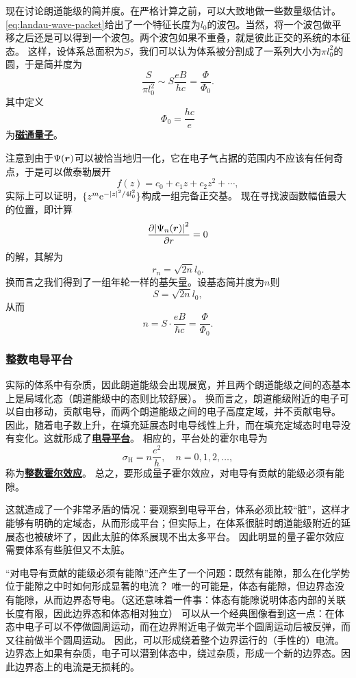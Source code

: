 \documentclass[hyperref, UTF8, a4paper]{ctexart}
\newcommand*{\ee}{\mathrm{e}}
\newcommand*{\concept}[1]{\underline{\textbf{#1}}}
\begin{document}
现在讨论朗道能级的简并度。在严格计算之前，可以大致地做一些数量级估计。
\eqref{eq:landau-wave-packet}给出了一个特征长度为$l_0$的波包。当然，将一个波包做平移之后还是可以得到一个波包。两个波包如果不重叠，就是彼此正交的系统的本征态。
这样，设体系总面积为$S$，我们可以认为体系被分割成了一系列大小为$\pi l_0^2$的圆，于是简并度为
\[
    \frac{S}{\pi l_0^2} \sim S \frac{eB}{h c} = \frac{\Phi}{\Phi_0}.
\]
其中定义
\begin{equation}
    \Phi_0 = \frac{h c}{e}
\end{equation}
为\concept{磁通量子}。

注意到由于$\Psi(\vb*{r})$可以被恰当地归一化，它在电子气占据的范围内不应该有任何奇点，于是可以做泰勒展开
\[
    f(z) = c_0 + c_1 z + c_2 z^2 + \cdots,
\]
实际上可以证明，$\{z^m \ee^{- \abs{z}^2 / 4 l_0^2}\}$构成一组完备正交基。
现在寻找波函数幅值最大的位置，即计算
\[
    \pdv{\abs{\Psi_n(\vb*{r})}^2}{r} = 0
\]
的解，其解为
\[
    r_n = \sqrt{2n} l_0.
\]
换而言之我们得到了一组年轮一样的基矢量。设基态简并度为$n$则
\[
    S = \sqrt{2n} l_0,
\]
从而
\[
    n = S \cdot \frac{eB}{\hbar c} = \frac{\Phi}{\Phi_0}.
\]

\subsubsection{整数电导平台}

实际的体系中有杂质，因此朗道能级会出现展宽，并且两个朗道能级之间的态基本上是局域化态（朗道能级中的态则比较舒展）。
换而言之，朗道能级附近的电子可以自由移动，贡献电导，而两个朗道能级之间的电子高度定域，并不贡献电导。
因此，随着电子数上升，在填充延展态时电导线性上升，而在填充定域态时电导没有变化。这就形成了\concept{电导平台}。
相应的，平台处的霍尔电导为
\[
    \sigma_\text{H} = n \frac{e^2}{h}, \quad n = 0, 1, 2, \ldots,
\]
称为\concept{整数霍尔效应}。
总之，要形成量子霍尔效应，对电导有贡献的能级必须有能隙。

这就造成了一个非常矛盾的情况：要观察到电导平台，体系必须比较“脏”，这样才能够有明确的定域态，从而形成平台；但实际上，在体系很脏时朗道能级附近的延展态也被破坏了，因此太脏的体系展现不出太多平台。
因此明显的量子霍尔效应需要体系有些脏但又不太脏。

“对电导有贡献的能级必须有能隙”还产生了一个问题：既然有能隙，那么在化学势位于能隙之中时如何形成显著的电流？
唯一的可能是，体态有能隙，但边界态没有能隙，从而边界态导电。（这还意味着一件事：体态有能隙说明体态内部的关联长度有限，因此边界态和体态相对独立）
可以从一个经典图像看到这一点：在体态中电子可以不停做圆周运动，而在边界附近电子做完半个圆周运动后被反弹，而又往前做半个圆周运动。
因此，可以形成绕着整个边界运行的（手性的）电流。边界态上如果有杂质，电子可以潜到体态中，绕过杂质，形成一个新的边界态。因此边界态上的电流是无损耗的。
\end{document}
